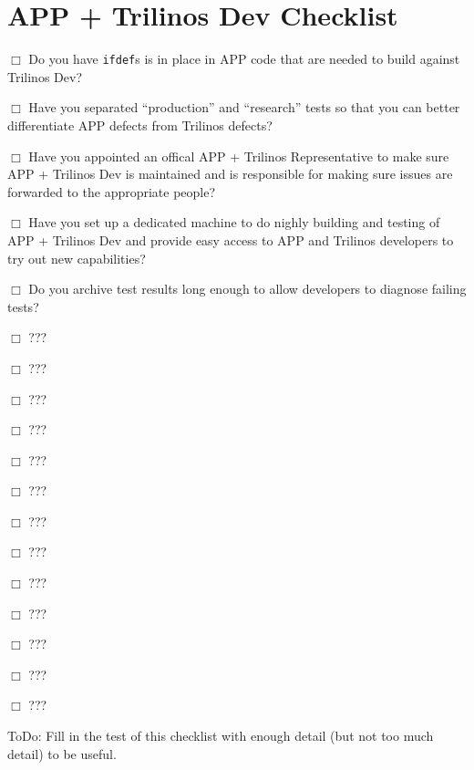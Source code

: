 \documentclass[pdf,ps2pdf,11pt]{SANDreport}
\begin{document}
%
\section{APP + Trilinos Dev Checklist}
%

$\Box$ Do you have {}\texttt{ifdef}s is in place in APP code that are needed
to build against Trilinos Dev?

$\Box$ Have you separated ``production'' and ``research'' tests so that you
can better differentiate APP defects from Trilinos defects?

$\Box$ Have you appointed an offical APP + Trilinos Representative to make
sure APP + Trilinos Dev is maintained and is responsible for making sure
issues are forwarded to the appropriate people?

$\Box$ Have you set up a dedicated machine to do nighly building and testing
of APP + Trilinos Dev and provide easy access to APP and Trilinos developers
to try out new capabilities?

$\Box$ Do you archive test results long enough to allow developers to diagnose
failing tests?

$\Box$ ???

$\Box$ ???

$\Box$ ???

$\Box$ ???

$\Box$ ???

$\Box$ ???

$\Box$ ???

$\Box$ ???

$\Box$ ???

$\Box$ ???

$\Box$ ???

$\Box$ ???

$\Box$ ???


ToDo: Fill in the test of this checklist with enough detail (but not too much
detail) to be useful.


\end{document}
